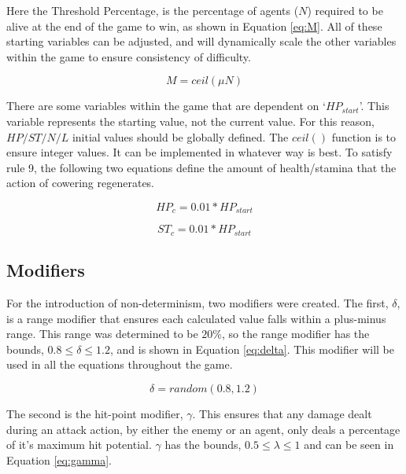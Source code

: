 Here the Threshold Percentage, is the percentage of agents ($N$) required to be alive at the end of the game to win, as shown in Equation \ref{eq:M}. All of these starting variables can be adjusted, and will dynamically scale the other variables within the game to ensure consistency of difficulty. 

\begin{equation}\label{eq:M}
    M = ceil(\mu N)
\end{equation}

There are some variables within the game that are dependent on `$HP_{start}$'. This variable represents the starting value, not the current value. For this reason, $HP/ST/N/L$ initial values should be globally defined. The $ceil()$ function is to ensure integer values. It can be implemented in whatever way is best. To satisfy rule 9, the following two equations define the amount of health/stamina that the action of cowering regenerates.  

\begin{equation}
    HP_c = 0.01*HP_{start}
\end{equation}

\begin{equation}
    ST_c = 0.01*HP_{start}
\end{equation}


\subsection{Modifiers}\label{sec: modifiers}


For the introduction of non-determinism, two modifiers were created. The first, $\delta$, is a range modifier that ensures each calculated value falls within a plus-minus range. This range was determined to be $20\%$, so the range modifier has the bounds, $0.8 \leq \delta \leq 1.2 $, and is shown in Equation \ref{eq:delta}. This modifier will be used in all the equations throughout the game. 

\begin{equation}\label{eq:delta}
    \delta = random(0.8,1.2)
\end{equation}

The second is the hit-point modifier, $\gamma$. This ensures that any damage dealt during an attack action, by either the enemy or an agent, only deals a percentage of it's maximum hit potential. $\gamma$ has the bounds, $0.5 \leq \lambda \leq 1$ and can be seen in Equation \ref{eq:gamma}. 

